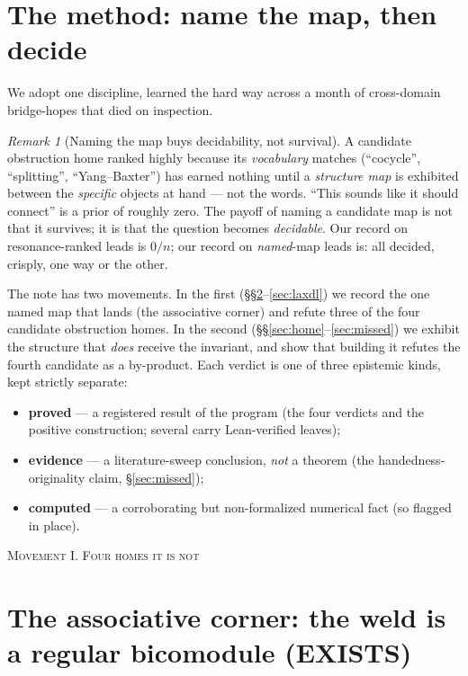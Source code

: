 \documentclass[11pt]{amsart}
\theoremstyle{plain}
\theoremstyle{definition}
\theoremstyle{remark}
\newtheorem{remark}[theorem]{Remark}
\begin{document}
\section{The method: name the map, then decide}
\label{sec:method}

We adopt one discipline, learned the hard way across a month of cross-domain bridge-hopes that died
on inspection.

\begin{remark}[Naming the map buys decidability, not survival]
\label{rem:method}
A candidate obstruction home ranked highly because its \emph{vocabulary} matches (``cocycle'',
``splitting'', ``Yang--Baxter'') has earned nothing until a \emph{structure map} is exhibited between
the \emph{specific} objects at hand --- not the words. ``This sounds like it should connect'' is a
prior of roughly zero. The payoff of naming a candidate map is not that it survives; it is that the
question becomes \emph{decidable}. Our record on resonance-ranked leads is $0/n$; our record on
\emph{named}-map leads is: all decided, crisply, one way or the other.
\end{remark}

The note has two movements. In the first (\S\S\ref{sec:exists}--\ref{sec:laxdl}) we record the one
named map that lands (the associative corner) and refute three of the four candidate obstruction
homes. In the second (\S\S\ref{sec:home}--\ref{sec:missed}) we exhibit the structure that \emph{does}
receive the invariant, and show that building it refutes the fourth candidate as a by-product. Each verdict is one of three epistemic kinds, kept
strictly separate:
\begin{itemize}
  \item \textbf{proved} --- a registered result of the program (the four verdicts and the positive
        construction; several carry Lean-verified leaves);
  \item \textbf{evidence} --- a literature-sweep conclusion, \emph{not} a theorem (the
        handedness-originality claim, \S\ref{sec:missed});
  \item \textbf{computed} --- a corroborating but non-formalized numerical fact (so flagged in place).
\end{itemize}

\bigskip
\begin{center}\textsc{Movement I. Four homes it is not}\end{center}

\section{The associative corner: the weld is a regular bicomodule (EXISTS)}
\label{sec:exists}
\end{document}
